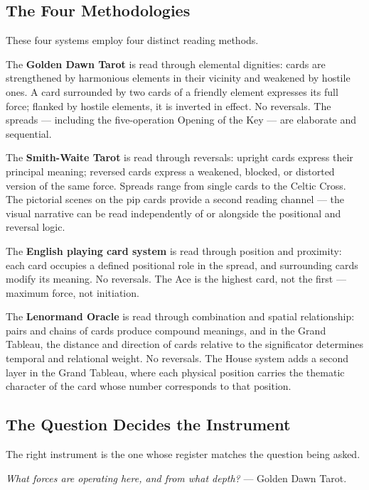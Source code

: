 \subsection{The Four Methodologies}\label{the-four-methodologies}

These four systems employ four distinct reading methods.

The \textbf{Golden Dawn Tarot} is read through elemental dignities: cards are strengthened by harmonious elements in their vicinity and weakened by hostile ones. A card surrounded by two cards of a friendly element expresses its full force; flanked by hostile elements, it is inverted in effect. No reversals. The spreads --- including the five-operation Opening of the Key --- are elaborate and sequential.

The \textbf{Smith-Waite Tarot} is read through reversals: upright cards express their principal meaning; reversed cards express a weakened, blocked, or distorted version of the same force. Spreads range from single cards to the Celtic Cross. The pictorial scenes on the pip cards provide a second reading channel --- the visual narrative can be read independently of or alongside the positional and reversal logic.

The \textbf{English playing card system} is read through position and proximity: each card occupies a defined positional role in the spread, and surrounding cards modify its meaning. No reversals. The Ace is the highest card, not the first --- maximum force, not initiation.

The \textbf{Lenormand Oracle} is read through combination and spatial relationship: pairs and chains of cards produce compound meanings, and in the Grand Tableau, the distance and direction of cards relative to the significator determines temporal and relational weight. No reversals. The House system adds a second layer in the Grand Tableau, where each physical position carries the thematic character of the card whose number corresponds to that position.

\subsection{The Question Decides the Instrument}\label{the-question-decides-the-instrument}

The right instrument is the one whose register matches the question being asked.

\emph{What forces are operating here, and from what depth?} --- Golden Dawn Tarot.

